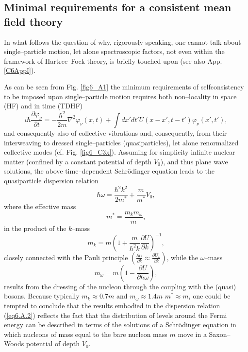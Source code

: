 \begin{subappendices}
\section[Minimal mean field theory]{Minimal requirements for a consistent mean field theory}\label{C6AppA}
In what follows the question of why, rigorously speaking, one cannot talk about single--particle motion, let alone spectroscopic factors, not even within the framework of Hartree--Fock theory, is briefly touched upon (see also App. \ref{C6AppI}).
	

As can be seen from Fig. \ref{fig6_A1} the minimum requirements of selfconsistency to be imposed upon single--particle motion requires both non--locality in space (HF) and in time (TDHF)
\begin{equation}\label{eq6.A.1}
i\hbar \frac{\partial \varphi_\nu}{\partial t}=-\frac{\hbar^2}{2 m}\nabla^2 \varphi_\nu(x,t)+\int dx'dt'U(x-x',t-t')\varphi_\nu(x',t'),
\end{equation}
and consequently also of collective vibrations and, consequently, from their interweaving to dressed single--particles (quasiparticles), let alone renormalized collective modes (cf. Fig. \ref{fig6_C3x}). Assuming for simplicity infinite nuclear matter (confined by a constant potential of depth $V_0$), and thus plane wave solutions, the above time--dependent Schr\"{o}dinger equation leads to the quasiparticle dispersion relation 
\begin{equation}\label{eq6.A.2}
\hbar\omega=\frac{\hbar^2k^2}{2m^*}+\frac{m}{m^*}V_0,
\end{equation}
where the effective mass
\begin{equation}\label{eq4.A.3}
m^*=\frac{m_k m_\omega}{m},
\end{equation}
in the product of the $k$--mass
\begin{equation}
m_k=m\left(1+\frac{m}{\hbar^2k}\frac{\partial U}{\partial k}\right)^{-1},
\end{equation}
closely connected with the Pauli principle $\left(\frac{\partial U}{\partial k}\approx \frac{\partial U_x}{\partial k}\right)$, while the $\omega$--mass
\begin{equation}\label{eq6A5}
m_\omega=m\left(1-\frac{\partial U}{\partial \hbar \omega}\right),
\end{equation}
results from the dressing of the nucleon through the coupling with the (quasi) bosons. Because typically $m_k\approx 0.7 m$ and $m_\omega \approx 1.4 m$ $m^*\approx m$, one could be tempted to conclude that the results embodied in the dispersion relation (\ref{eq6.A.2}) reflects the fact that the distribution of levels around the Fermi energy can be described in terms of the solutions of a Schr\"{o}dinger equation in which nucleons of mass equal to the bare nucleon mass $m$ move in a Saxon--Woods potential of depth $V_0$.

\end{subappendices}
